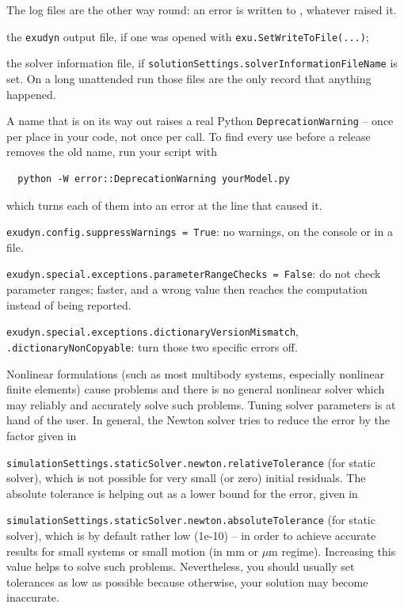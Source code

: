 \noindent The log files are the other way round: an error is written to , whatever raised it.
\bi
  \item the \texttt{exudyn} output file, if one was opened with \texttt{exu.SetWriteToFile(...)};
  \item the solver information file, if \texttt{solutionSettings.solverInformationFileName} is set.
\ei
\noindent On a long unattended run those files are the only record that anything happened.

%
A name that is on its way out raises a real Python \texttt{DeprecationWarning} -- once per place
in your code, not once per call. To find every use before a release removes the old name, run
your script with
\plainlststyle\begin{lstlisting}
  python -W error::DeprecationWarning yourModel.py
\end{lstlisting}
\noindent which turns each of them into an error at the line that caused it.

%
\bi
  \item \texttt{exudyn.config.suppressWarnings = True}: no warnings, on the console or in a file.
  \item \texttt{exudyn.special.exceptions.parameterRangeChecks = False}: do not check parameter ranges; faster, and a wrong value then reaches the computation instead of being reported.
  \item \texttt{exudyn.special.exceptions.dictionaryVersionMismatch}, \texttt{.dictionaryNonCopyable}: turn those two specific errors off.
\ei

Nonlinear formulations (such as most multibody systems, especially nonlinear finite elements) cause problems and there is no general nonlinear solver which may reliably and accurately solve such problems.
Tuning solver parameters is at hand of the user. 
In general, the Newton solver tries to reduce the error by the factor given in 
\bi
  \item \texttt{simulationSettings.staticSolver.newton.relativeTolerance} (for static solver), 
\ei
which is not possible for very small (or zero) initial residuals. The absolute tolerance is helping out as a lower bound for the error, given in
\bi
  \item \texttt{simulationSettings.staticSolver.newton.absoluteTolerance} (for static solver),
\ei
which is by default rather low (1e-10) -- in order to achieve accurate results for small systems or small motion (in mm or $\mu$m regime). Increasing this value helps to solve such problems. Nevertheless, you should usually set tolerances as low as possible because otherwise, your solution may become inaccurate.

